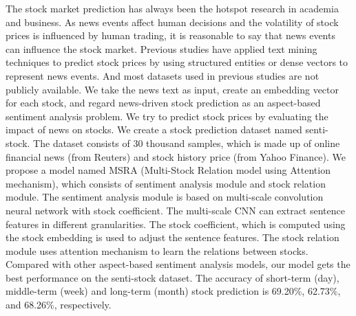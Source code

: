 
\begin{eabstract}
  The stock market prediction has always been the hotspot research in academia and business. As news events affect human decisions and the volatility of stock prices is influenced by human trading, it is reasonable to say that news events can influence the stock market. Previous studies have applied text mining techniques to predict stock prices by using structured entities or dense vectors to represent news events. And most datasets used in previous studies are not publicly available. We take the news text as input, create an embedding vector for each stock, and regard news-driven stock prediction as an aspect-based sentiment analysis problem. We try to predict stock prices by evaluating the impact of news on stocks. We create a stock prediction dataset named senti-stock. The dataset consists of 30 thousand samples, which is made up of online financial news (from Reuters) and stock history price (from Yahoo Finance). We propose a model named MSRA (Multi-Stock Relation model using Attention mechanism), which consists of sentiment analysis module and stock relation module. The sentiment analysis module is based on multi-scale convolution neural network with stock coefficient. The multi-scale CNN can extract sentence features in different granularities. The stock coefficient, which is computed using the stock embedding is used to adjust the sentence features. The stock relation module uses attention mechanism to learn the relations between stocks. Compared with other aspect-based sentiment analysis models, our model gets the best performance on the senti-stock dataset. The accuracy of short-term (day), middle-term (week) and long-term (month) stock prediction is 69.20\%, 62.73\%, and 68.26\%, respectively.
  

\end{eabstract}
